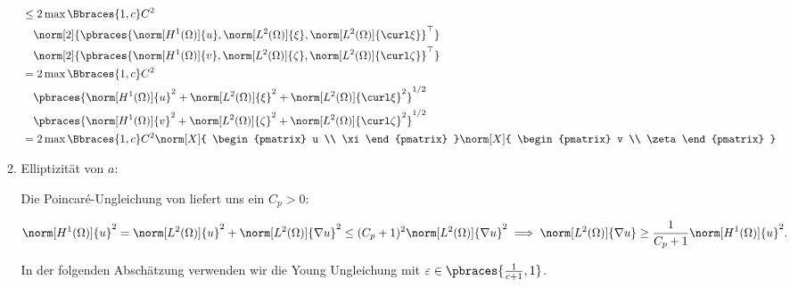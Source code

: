 \begin{solution}
\begin{enumerate}[label = \textbf{\alph*)}]
\begin{enumerate}[label = \arabic*.]
\begin{align*}
{      } \\
      & \leq
      2 \max \Bbraces{1, c} C^2 \\
      & \quad
      \norm[2]
      {
        \pbraces
        {
          \norm[H^1(\Omega)]{u},
          \norm[L^2(\Omega)]{\xi},
          \norm[L^2(\Omega)]{\curl \xi}
        }^\top
      } \\
      & \quad
      \norm[2]
      {
        \pbraces
        {
          \norm[H^1(\Omega)]{v},
          \norm[L^2(\Omega)]{\zeta},
          \norm[L^2(\Omega)]{\curl \zeta}
        }^\top
      } \\
      & =
      2 \max \Bbraces{1, c} C^2 \\
      & \quad
      \pbraces
      {
        \norm[H^1(\Omega)]{u}^2
        +
        \norm[L^2(\Omega)]{\xi}^2
        +
        \norm[L^2(\Omega)]{\curl \xi}^2
      }^{1/2} \\
      & \quad
      \pbraces
      {
        \norm[H^1(\Omega)]{v}^2
        +
        \norm[L^2(\Omega)]{\zeta}^2
        +
        \norm[L^2(\Omega)]{\curl \zeta}^2
      }^{1/2} \\
      & =
      2 \max \Bbraces{1, c} C^2
      \norm[X]
      {
        \begin{pmatrix}
          u \\ \xi
        \end{pmatrix}
      }
      \norm[X]
      {
        \begin{pmatrix}
          v \\ \zeta
        \end{pmatrix}
      }
    \end{align*}

    \item Elliptizität von $a$:


    Die Poincaré-Ungleichung von \cite{PDEs} liefert uns ein $C_p > 0:$

    \begin{align*}
      \norm[H^1(\Omega)]{u}^2
      =
      \norm[L^2(\Omega)]{u}^2
      +
      \norm[L^2(\Omega)]{\nabla u}^2
      \leq
      (C_p + 1)^2 \norm[L^2(\Omega)]{\nabla u}^2
      \implies
      \norm[L^2(\Omega)]{\nabla u}
      \geq
      \frac{1}{C_p + 1}
      \norm[H^1(\Omega)]{u}^2.
    \end{align*}

    In der folgenden Abschätzung verwenden wir die Young Ungleichung mit $\varepsilon \in \pbraces{\frac{1}{c + 1}, 1}$.


\end{enumerate}
\end{enumerate}
\end{solution}
